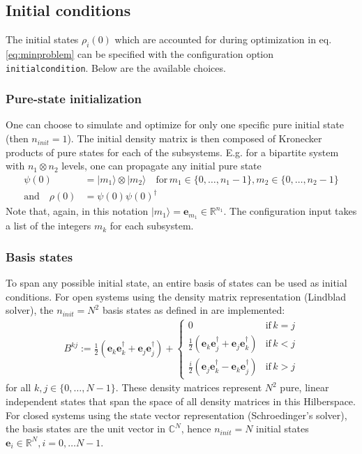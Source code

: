 \documentclass[11pt]{article}
\newcommand{\R}{\mathds{R}}
\newcommand{\C}{\mathds{C}}
\newcommand{\bs}[1]{{\boldsymbol{#1}}}
\begin{document}
\subsection{Initial conditions}\label{subsec:initcond}
The initial states $\rho_i(0)$ which are accounted for during optimization in eq. \eqref{eq:minproblem} can be specified with the configuration option \texttt{initialcondition}. Below are the available choices. 

\subsubsection{Pure-state initialization}
One can choose to simulate and optimize for only one specific pure initial state (then $n_{init} = 1$). The initial density matrix is then composed of Kronecker products of pure states for each of the subsystems. E.g. for a bipartite system with $n_1
\otimes n_2$ levels, one can propagate any initial pure state 
\begin{align}
  \psi(0) &= |m_1\rangle \otimes |m_2\rangle \quad \text{for} \, m_1 \in \{0,\dots, n_1-1\}, m_2\in \{0,\dots, n_2-1\}\\
   \text{and} \quad \rho(0) &= \psi(0)\psi(0)^\dagger 
\end{align}
Note that, again, in this notation $|m_1\rangle = \boldsymbol{e}_{m_1} \in \R^{n_1}$. The configuration input takes a list of the integers $m_k$ for each subsystem. 

\subsubsection{Basis states}


To span any possible initial state, an entire basis of states can be used as initial conditions. For open systems using the density matrix representation (Lindblad solver), the $n_{init}=N^2$ basis states as defined in \cite{guenther2021quantum} are implemented:
\begin{align}\label{eq:basismats}
B^{kj} := \frac 12 \left(\bs{e}_k\bs{e}_k^\dagger + \bs{e}_j\bs{e}_j^\dagger\right) +  \begin{cases} 
          0 & \text{if} \, k=j \\ 
        \frac 12 \left( \bs{e}_k\bs{e}_j^\dagger  + \bs{e}_j\bs{e}_k^\dagger \right) & \text{if} \, k<j \\
        \frac i2 \left( \bs{e}_j\bs{e}_k^\dagger  - \bs{e}_k\bs{e}_j^\dagger \right) & \text{if} \, k>j
      \end{cases} 
\end{align}
for all $k,j\in\{0,\dots, N-1\}$.
These density matrices represent $N^2$ pure, linear independent states that span the space of all density matrices in this Hilberspace. For closed systems using the state vector representation (Schroedinger's solver), the basis states are the unit vector in $\C^{N}$, hence $n_{init} = N$ initial states $\boldsymbol{e}_i \in \R^N, i=0,\dots N-1$. 
\end{document}
